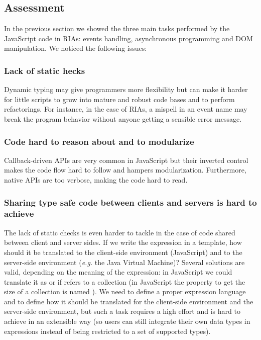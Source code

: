 \documentclass[american,english,runningheads]{llncs}
\newcommand{\eg}{\emph{e.g.}}
\begin{document}
\subsection{Assessment}
\label{assessment}

In the previous section we showed the three main tasks performed by the JavaScript code in RIAs: events handling,
asynchronous programming and DOM manipulation. We noticed the following issues:

\subsubsection{Lack of static hecks}

Dynamic typing may give programmers more flexibility but can make it harder for little scripts to grow into mature
and robust code bases and to perform refactorings. For instance, in the case of RIAs, a mispell in an event name may
break the program behavior without anyone getting a sensible error message.

\subsubsection{Code hard to reason about and to modularize}

Callback-driven APIs are very common in JavaScript but their inverted control makes the code flow hard to follow and
hampers modularization. Furthermore, native APIs are too verbose, making the code hard to read.

\subsubsection{Sharing type safe code between clients and servers is hard to achieve}

The lack of static checks is even harder to tackle in the case of code shared between client and server sides. If we
write the expression  in a template, how should it be translated to the client-side environment
(JavaScript) and to the server-side environment (\eg{} the Java Virtual Machine)? Several solutions are valid,
depending on the meaning of the expression: in JavaScript we could translate it as  or
 if  refers to a collection (in JavaScript the property to get the size of a
collection is named ). We need to define a proper expression language and to define how it should be
translated for the client-side environment and the server-side environment, but such a task requires a high effort
and is hard to achieve in an extensible way (so users can still integrate their own data types in expressions instead
of being restricted to a set of supported types).
\end{document}
